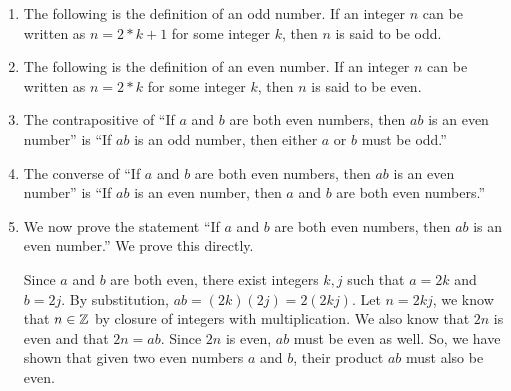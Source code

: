 \documentclass{article}
\begin{document}
\begin{enumerate}
    \item The following is the definition of an odd number.
    If an integer $n$ can be written as $ n = 2*k + 1 $ for some integer $k$, then $n$ is said to be odd.
    \item The following is the definition of an even number.
    If an integer $n$ can be written as $ n = 2*k$ for some integer $k$, then $n$ is said to be even.
    \item The contrapositive of ``If $a$ and $b$ are both even numbers, then $ab$ is an even number'' is ``If $ab$ is an odd number, then either $a$ or $b$ must be odd.''
    \item The converse of ``If $a$ and $b$ are both even numbers, then $ab$ is an even number'' is ``If $ab$ is an even number, then $a$ and $b$ are both even numbers.''
    \item We now prove the statement ``If $a$ and $b$ are both even numbers, then $ab$ is an even number.''
    We prove this directly.

    Since $a$ and $b$ are both even, there exist integers $k,j$ such that $a = 2k$ and $b = 2j$.
    By substitution, $ab = (2k) (2j) = 2(2kj) $.
    Let $n = 2kj$, we know that $n \in {\mathbb Z}$ by closure of integers with multiplication.
    We also know that $2n$ is even and that $2n = ab$.
    Since $2n$ is even, $ab$ must be even as well.
    So, we have shown that given two even numbers $a$ and $b$, their product $ab$ must also be even.
\end{enumerate}


\end{document}
